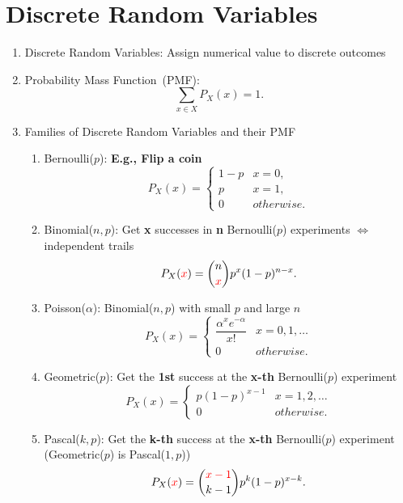 \chapter{Discrete Random Variables}
\begin{enumerate}
    \item Discrete Random Variables: Assign numerical value to discrete outcomes
    \item Probability Mass Function~(PMF): \[\sum_{x\in X}P_X(x)=1.\] 
    \item Families of Discrete Random Variables and their PMF{
        \begin{enumerate}
            \item Bernoulli($p$): \textbf{E.g., Flip a coin}{
                \[ P_X(x) = 
                \begin{cases}
                    1-p & x=0, \\
                    p   & x=1, \\
                    0   & otherwise.
                \end{cases} \]
            }
            \item Binomial($n, p$): Get \textbf{x} successes in \textbf{n} Bernoulli($p$) experiments $\iff$ independent trails{
                \[P_X(\textcolor{red}{x}) = \binom{n}{\textcolor{red}{x}}p^x(1-p)^{n-x}.\]
            }
            \item Poisson($\alpha$): Binomial($n, p$) with small $p$ and large $n${
                \[ P_X(x) = 
                \begin{cases}
                    \dfrac{\alpha^xe^{-\alpha}}{x!}   & x=0,1,\ldots \\
                    0   & otherwise.
                \end{cases} \]
            }
            \item Geometric($p$): Get the \textbf{1st} success at the \textbf{x-th} Bernoulli($p$) experiment {
                \[ P_X(x) = 
                \begin{cases}
                    p(1-p)^{x-1} & x=1,2,\ldots \\
                    0   & otherwise.
                \end{cases} \]
            }
            \item Pascal($k,p$): Get the \textbf{k-th} success at the \textbf{x-th} Bernoulli($p$) experiment (Geometric($p$) is Pascal($1,p$)){
                \[P_X(\textcolor{red}{x}) = \binom{\textcolor{red}{x-1}}{k-1}p^k(1-p)^{x-k}.\]
}
\end{enumerate}}
\end{enumerate}
